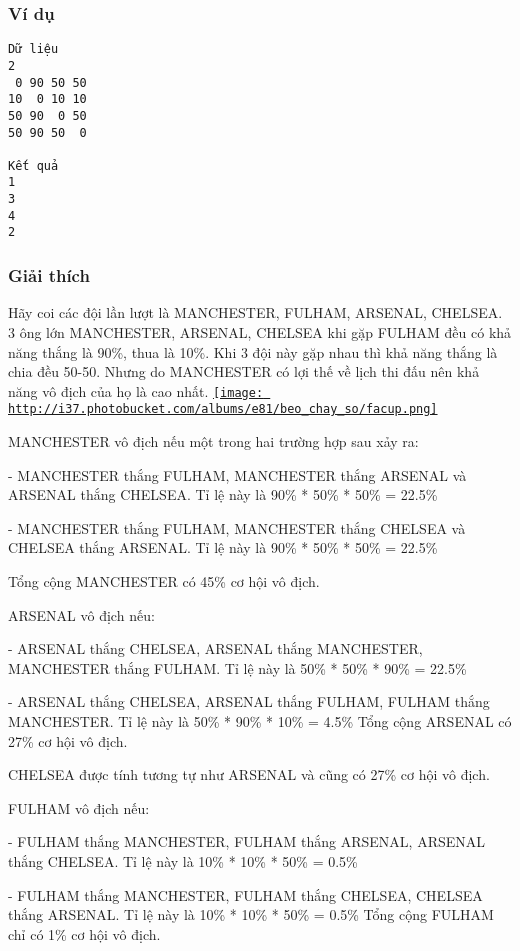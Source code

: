 \subsubsection{   Ví dụ  }
\begin{verbatim}
Dữ liệu
2
 0 90 50 50
10  0 10 10
50 90  0 50
50 90 50  0

Kết quả
1
3
4
2
\end{verbatim}

\subsubsection{   Giải thích  }

   Hãy coi các đội lần lượt là MANCHESTER, FULHAM, ARSENAL, CHELSEA. 3 ông lớn MANCHESTER, ARSENAL, CHELSEA khi gặp FULHAM đều có khả năng thắng là 90\%, thua là 10\%. Khi 3 đội này gặp nhau thì khả năng thắng là chia đều 50-50. Nhưng do MANCHESTER có lợi thế về lịch thi đấu nên khả năng vô địch của họ là cao nhất.  \href{http://s37.photobucket.com/albums/e81/beo_chay_so/?action=view¤t=facup.png}{
\texttt{[image: http://i37.photobucket.com/albums/e81/beo\_chay\_so/facup.png]}}

   MANCHESTER vô địch nếu một trong hai trường hợp sau xảy ra:  

   - MANCHESTER thắng FULHAM, MANCHESTER thắng ARSENAL và ARSENAL thắng CHELSEA. Tỉ lệ này là 90\% * 50\% * 50\% = 22.5\%  

   - MANCHESTER thắng FULHAM, MANCHESTER thắng CHELSEA và CHELSEA thắng ARSENAL. Tỉ lệ này là 90\% * 50\% * 50\% = 22.5\%  

   Tổng cộng MANCHESTER có 45\% cơ hội vô địch.  

   ARSENAL vô địch nếu:  

   - ARSENAL thắng CHELSEA, ARSENAL thắng MANCHESTER, MANCHESTER thắng FULHAM. Tỉ lệ này là 50\% * 50\% * 90\% = 22.5\%  

   - ARSENAL thắng CHELSEA, ARSENAL thắng FULHAM, FULHAM thắng MANCHESTER. Tỉ lệ này là 50\% * 90\% * 10\% = 4.5\% Tổng cộng ARSENAL có 27\% cơ hội vô địch.  

   CHELSEA được tính tương tự như ARSENAL và cũng có 27\% cơ hội vô địch.  

   FULHAM vô địch nếu:  

   - FULHAM thắng MANCHESTER, FULHAM thắng ARSENAL, ARSENAL thắng CHELSEA. Tỉ lệ này là 10\% * 10\% * 50\% = 0.5\%  

   - FULHAM thắng MANCHESTER, FULHAM thắng CHELSEA, CHELSEA thắng ARSENAL. Tỉ lệ này là 10\% * 10\% * 50\% = 0.5\% Tổng cộng FULHAM chỉ có 1\% cơ hội vô địch.  